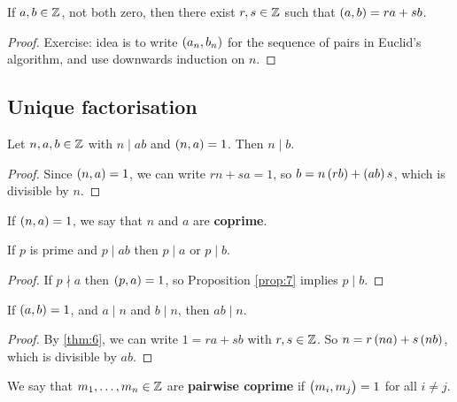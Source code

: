 \begin{theorem}
\label{thm:6}
If $ a, b \in \mathbb{Z} $, not both zero, then there exist $ r, s \in \mathbb{Z} $ such that $ \br{a, b} = ra + sb $.
\end{theorem}

\begin{proof}
Exercise: idea is to write $ \br{a_n, b_n} $ for the sequence of pairs in Euclid's algorithm, and use downwards induction on $ n $.
\end{proof}

\pagebreak

\subsection{Unique factorisation}

\begin{proposition}
\label{prop:7}
Let $ n, a, b \in \mathbb{Z} $ with $ n \mid ab $ and $ \br{n, a} = 1 $. Then $ n \mid b $.
\end{proposition}

\begin{proof}
Since $ \br{n, a} = 1 $, we can write $ rn + sa = 1 $, so $ b = n\br{rb} + \br{ab}s $, which is divisible by $ n $.
\end{proof}

If $ \br{n, a} = 1 $, we say that $ n $ and $ a $ are \textbf{coprime}.


\begin{corollary}
\label{cor:8}
If $ p $ is prime and $ p \mid ab $ then $ p \mid a $ or $ p \mid b $.
\end{corollary}

\begin{proof}
If $ p \nmid a $ then $ \br{p, a} = 1 $, so Proposition \ref{prop:7} implies $ p \mid b $.
\end{proof}

\begin{proposition}
\label{prop:9}
If $ \br{a, b} = 1 $, and $ a \mid n $ and $ b \mid n $, then $ ab \mid n $.
\end{proposition}

\begin{proof}
By \ref{thm:6}, we can write $ 1 = ra + sb $ with $ r, s \in \mathbb{Z} $. So $ n = r\br{na} + s\br{nb} $, which is divisible by $ ab $.
\end{proof}

We say that $ m_1, \dots, m_n \in \mathbb{Z} $ are \textbf{pairwise coprime} if $ \br{m_i, m_j} = 1 $ for all $ i \ne j $.

